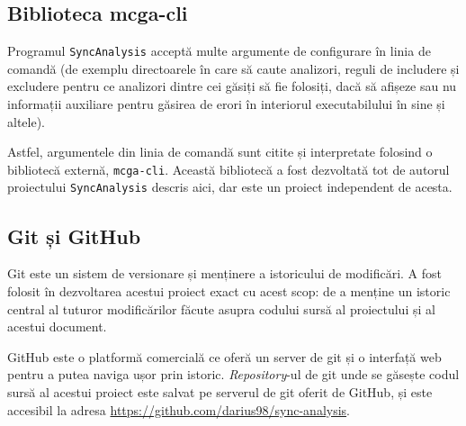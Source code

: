 \subsection{Biblioteca mcga-cli}

Programul \lstinline{SyncAnalysis} acceptă multe argumente de
configurare în linia de comandă (de exemplu directoarele în care să
caute analizori, reguli de includere și excludere pentru ce analizori
dintre cei găsiți să fie folosiți, dacă să afișeze sau nu informații
auxiliare pentru găsirea de erori în interiorul executabilului în sine
și altele).

Astfel, argumentele din linia de comandă sunt citite și interpretate
folosind o bibliotecă externă, \lstinline{mcga-cli}\cite{mcga-cli}.
Această bibliotecă a fost dezvoltată tot de autorul proiectului
\lstinline{SyncAnalysis} descris aici, dar este un proiect independent
de acesta.

\subsection{Git și GitHub}

Git\cite{git} este un sistem de versionare și menținere a istoricului de
modificări. A fost folosit în dezvoltarea acestui proiect exact cu acest
scop: de a menține un istoric central al tuturor modificărilor făcute
asupra codului sursă al proiectului și al acestui document.

GitHub\cite{GitHub} este o platformă comercială ce oferă un server de
git și o interfață web pentru a putea naviga ușor prin istoric.
\textit{Repository}-ul de git unde se găsește codul sursă al acestui
proiect este salvat pe serverul de git oferit de GitHub, și este
accesibil la adresa \url{https://github.com/darius98/sync-analysis}.
